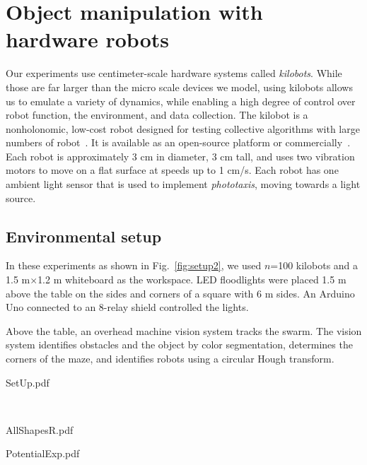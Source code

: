 
\section{Object manipulation with hardware robots}\label{sec:realExperiment}
Our experiments use centimeter-scale hardware systems called \emph{kilobots}.  While those are far larger than the micro scale devices we model, using kilobots allows us to emulate a variety of dynamics, while enabling a high degree of control over robot function, the environment, and data collection. The kilobot is a nonholonomic, low-cost robot designed for testing collective algorithms with large numbers of robot~\cite{Rubenstein2012,rubenstein2014programmable}. It is available as an open-source platform or commercially~\cite{K-Team2015}.  Each robot is approximately 3 cm in diameter, 3 cm tall, and uses two vibration motors to move on a flat surface at speeds up to 1 cm/s.  Each robot has one ambient light sensor that is used to implement \emph{phototaxis},  moving towards a light source. 

  
\subsection{Environmental setup}  
In these experiments as shown in Fig.~\ref{fig:setup2}, we used $n$=100 kilobots and a 1.5 m$\times$1.2 m whiteboard as the workspace. 
LED floodlights were placed 1.5 m above the table on the sides and corners of a square with 6 m sides. An Arduino Uno connected to an 8-relay shield controlled the lights.  

Above the table, an overhead machine vision system tracks the swarm. The vision system identifies obstacles and the object by color segmentation, determines the corners of the maze, and identifies robots using a circular Hough transform. 

\begin{figure*}
\begin{center}
	\begin{overpic}[width=0.7\columnwidth]{SetUp.pdf}%
	\end{overpic}\\
	\vspace{3em}
	\begin{overpic}[width=0.33\columnwidth]{AllShapesR.pdf}%
	\end{overpic}
	\begin{overpic}[width=0.6\columnwidth]{PotentialExp.pdf}%
	\end{overpic}
\end{center}
\caption{\label{fig:setup2}
Hardware platform. At right are the shapes used for hardware experiments and a visualization of the potential field. }
\end{figure*}


